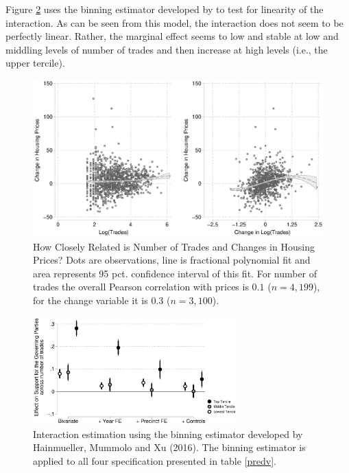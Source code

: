 \documentclass[12pt,a4paper]{article}
\begin{document}
			Figure \ref{terciles} uses the binning estimator developed by \cite{hainmueller2016much} to test for linearity of the interaction. As can be seen from this model, the interaction does not seem to be perfectly linear. Rather, the marginal effect seems to low and stable at low and middling levels of number of trades and then increase at high levels (i.e., the upper tercile).
			
			\begin{figure}
				\includegraphics[width=1\textwidth]{../figures/corrmoderator.eps}
				\caption{How Closely Related is Number of Trades and Changes in Housing Prices? Dots are observations, line is fractional polynomial fit and area represents 95 pct. confidence interval of this fit. For number of trades the overall Pearson correlation with prices is $0.1$ ($n=4,199$), for the change variable it is $0.3$ ($n=3,100$). }
				\label{scatter}
			\end{figure}
			
			
			\begin{figure}
				\includegraphics[width=0.7\textwidth]{../figures/localactivity_sup.eps}
				
				\caption{Interaction estimation using the binning estimator developed by Hainmueller, Mummolo and Xu (2016). The binning estimator is applied to all four specification presented in table \ref{predv}. }
				\label{terciles}
			\end{figure}
			
\end{document}
